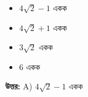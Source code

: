 \documentclass[12pt, a4paper]{article}
\begin{document}
\begin{itemize}[label={}, leftmargin=1cm, itemsep=0.5em]
    \item[\textbf{A)}] $4\sqrt{2} - 1$ একক
    \item[\textbf{B)}] $4\sqrt{2} + 1$ একক
    \item[\textbf{C)}] $3\sqrt{2}$ একক
    \item[\textbf{D)}] $6$ একক
\end{itemize}

\vspace{0.5em}
\begin{tcolorbox}[answerbox]
    \textbf{\color{success} উত্তর:} A) $4\sqrt{2} - 1$ একক
\end{tcolorbox}
\vspace{1em}
\end{document}
